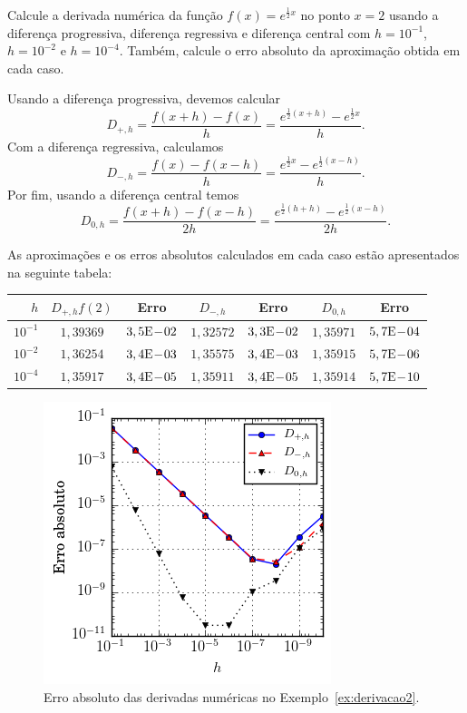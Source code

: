 \begin{ex}\label{ex:derivacao2}
Calcule a derivada numérica da função $f(x)=e^{\frac{1}{2}x}$ no ponto $x=2$ usando a diferença progressiva, diferença regressiva e diferença central com $h=10^{-1}$, $h=10^{-2}$ e $h=10^{-4}$. Também, calcule o erro absoluto da aproximação obtida em cada caso.
\end{ex}
\begin{sol}
  Usando a diferença progressiva, devemos calcular
  \begin{equation}
    D_{+,h} = \frac{f(x+h) - f(x)}{h} = \frac{e^{\frac{1}{2}(x+h)} - e^{\frac{1}{2}x}}{h}.
  \end{equation}
  Com a diferença regressiva, calculamos
  \begin{equation}
    D_{-,h} = \frac{f(x) - f(x-h)}{h} = \frac{e^{\frac{1}{2}x} - e^{\frac{1}{2}(x-h)}}{h}.
  \end{equation}
  Por fim, usando a diferença central temos
  \begin{equation}
    D_{0,h} = \frac{f(x+h) - f(x-h)}{2h} = \frac{e^{\frac{1}{2}(h+h)} - e^{\frac{1}{2}(x-h)}}{2h}.
  \end{equation}

  As aproximações e os erros absolutos calculados em cada caso estão apresentados na seguinte tabela:
  \begin{center}
    \begin{tabular}{r|cc|cc|cc}
      $h$  & $D_{+,h}f(2)$ & Erro & $D_{-,h}$ & Erro & $D_{0,h}$ & Erro \\\hline
      $10^{-1}$ & $1,39369$ & $3,5\mathrm{E}\!-\!02$   & $1,32572$ & $3,3\mathrm{E}\!-\!02$ & $1,35971$ & $5,7\mathrm{E}\!-\!04$\\
      $10^{-2}$ & $1,36254$ & $3,4\mathrm{E}\!-\!03$   & $1,35575$ & $3,4\mathrm{E}\!-\!03$ & $1,35915$ & $5,7\mathrm{E}\!-\!06$\\
      $10^{-4}$ & $1,35917$ & $3,4\mathrm{E}\!-\!05$   & $1,35911$ & $3,4\mathrm{E}\!-\!05$ & $1,35914$ & $5,7\mathrm{E}\!-\!10$\\\hline
    \end{tabular}
  \end{center}
\end{sol}

\begin{figure}
  \centering
  \includegraphics{./cap_derivacao/pics/ex_derivacao2/ex_derivacao2}
  \caption{Erro absoluto das derivadas numéricas no Exemplo~\ref{ex:derivacao2}.}
  \label{fig:ex_derivacao2}
\end{figure}


